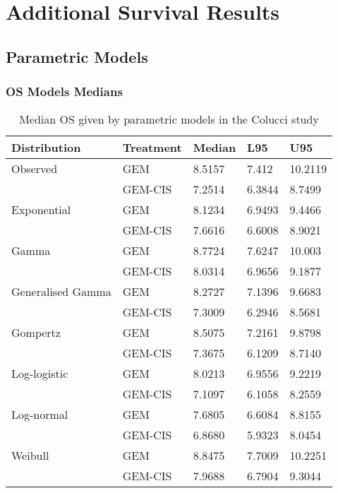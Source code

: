 \chapter{Additional Survival Results}

\section{Parametric Models}

\subsection{OS Models Medians}

\begin{table}
    \center
    \begin{tabular}{lllll}
    \hline
    Distribution      & Treatment & Median & L95    & U95     \\ \hline
    Observed          & GEM       & 8.5157 & 7.412  & 10.2119 \\
                      & GEM-CIS   & 7.2514 & 6.3844 & 8.7499  \\ \hline
    Exponential       & GEM       & 8.1234 & 6.9493 & 9.4466  \\
                      & GEM-CIS   & 7.6616 & 6.6008 & 8.9021  \\
    Gamma             & GEM       & 8.7724 & 7.6247 & 10.003  \\
                      & GEM-CIS   & 8.0314 & 6.9656 & 9.1877  \\
    Generalised Gamma & GEM       & 8.2727 & 7.1396 & 9.6683  \\
                      & GEM-CIS   & 7.3009 & 6.2946 & 8.5681  \\
    Gompertz          & GEM       & 8.5075 & 7.2161 & 9.8798  \\
                      & GEM-CIS   & 7.3675 & 6.1209 & 8.7140  \\
    Log-logistic      & GEM       & 8.0213 & 6.9556 & 9.2219  \\
                      & GEM-CIS   & 7.1097 & 6.1058 & 8.2559  \\
    Log-normal        & GEM       & 7.6805 & 6.6084 & 8.8155  \\
                      & GEM-CIS   & 6.8680 & 5.9323 & 8.0454  \\
    Weibull           & GEM       & 8.8475 & 7.7009 & 10.2251 \\
                      & GEM-CIS   & 7.9688 & 6.7904 & 9.3044  \\ \hline
    \end{tabular}
    \caption{Median OS given by parametric models in the Colucci study}
    \label{colucciModelMedians}
\end{table}


